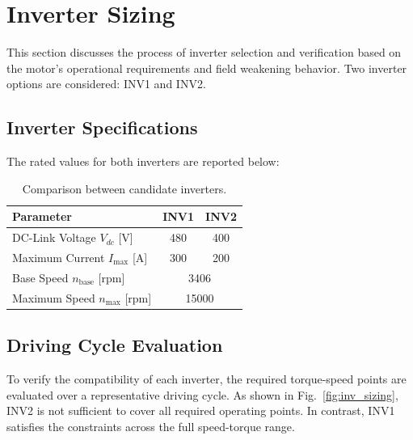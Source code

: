 \section{Inverter Sizing}
\label{Sect:2}

This section discusses the process of inverter selection and verification based on the motor's operational requirements and field weakening behavior. Two inverter options are considered: INV1 and INV2.

\subsection{Inverter Specifications}

The rated values for both inverters are reported below:

\begin{table}[!h]
    \centering
    \begin{tabular}{lcc}
        \toprule
        \textbf{Parameter} & \textbf{INV1} & \textbf{INV2} \\
        \midrule
        DC-Link Voltage $V_{dc}$ [V] & 480 & 400 \\
        Maximum Current $I_{\text{max}}$ [A] & 300 & 200 \\
        Base Speed $n_{\text{base}}$ [rpm] & \multicolumn{2}{c}{3406} \\
        Maximum Speed $n_{\text{max}}$ [rpm] & \multicolumn{2}{c}{15000} \\
        \bottomrule
    \end{tabular}
    \caption{Comparison between candidate inverters.}
    \label{tab:inverters}
\end{table}

\subsection{Driving Cycle Evaluation}

To verify the compatibility of each inverter, the required torque-speed points are evaluated over a representative driving cycle. As shown in Fig.~\ref{fig:inv_sizing}, INV2 is not sufficient to cover all required operating points. In contrast, INV1 satisfies the constraints across the full speed-torque range.

